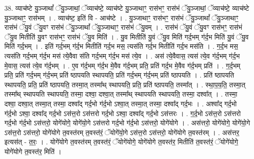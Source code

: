 \documentclass[17pt]{extarticle}
\begin{document}
38. व्याच॑ष्टे यु॒ञ्जाथां᳚ ॅयु॒ञ्जाथां॒ ॅव्याच॑ष्टे॒ व्याच॑ष्टे यु॒ञ्जाथाꣳ॒॒ रास॑भꣳ॒॒ रास॑भं ॅयु॒ञ्जाथां॒ ॅव्याच॑ष्टे॒ व्याच॑ष्टे यु॒ञ्जाथाꣳ॒॒ रास॑भम् । . व्याच॑ष्ट॒ इति॑ वि - आच॑ष्टे । . यु॒ञ्जाथाꣳ॒॒ रास॑भꣳ॒॒ रास॑भं ॅयु॒ञ्जाथां᳚ ॅयु॒ञ्जाथाꣳ॒॒ रास॑भं ॅयु॒वं ॅयु॒वꣳ रास॑भं ॅयु॒ञ्जाथां᳚ ॅयु॒ञ्जाथाꣳ॒॒ रास॑भं ॅयु॒वम् । . रास॑भं ॅयु॒वं ॅयु॒वꣳ रास॑भꣳ॒॒ रास॑भं ॅयु॒व मितीति॑ यु॒वꣳ रास॑भꣳ॒॒ रास॑भं ॅयु॒व मिति॑ । . यु॒व मितीति॑ यु॒वं ॅयु॒व मिति॑ गर्द॒भम् ग॑र्द॒भ मिति॑ यु॒वं ॅयु॒व मिति॑ गर्द॒भम् । . इति॑ गर्द॒भम् ग॑र्द॒भ मितीति॑ गर्द॒भ मस॒ त्यस॑ति गर्द॒भ मितीति॑ गर्द॒भ मस॑ति । . ग॒र्द॒भ मस॒ त्यस॑ति गर्द॒भम् ग॑र्द॒भ मस॑ त्ये॒वैवा स॑ति गर्द॒भम् ग॑र्द॒भ मस॑ त्ये॒व । . अस॑ त्ये॒वैवास॒ त्यस॑ त्ये॒व ग॑र्द॒भम् ग॑र्द॒भ मे॒वास॒ त्यस॑ त्ये॒व ग॑र्द॒भम् । . ए॒व ग॑र्द॒भम् ग॑र्द॒भ मे॒वैव ग॑र्द॒भम् प्रति॒ प्रति॑ गर्द॒भ मे॒वैव ग॑र्द॒भम् प्रति॑ । . ग॒र्द॒भम् प्रति॒ प्रति॑ गर्द॒भम् ग॑र्द॒भम् प्रति॑ ष्ठापयति स्थापयति॒ प्रति॑ गर्द॒भम् ग॑र्द॒भम् प्रति॑ ष्ठापयति । . प्रति॑ ष्ठापयति स्थापयति॒ प्रति॒ प्रति॑ ष्ठापयति॒ तस्मा॒त् तस्मा᳚थ् स्थापयति॒ प्रति॒ प्रति॑ ष्ठापयति॒ तस्मा᳚त् । . स्था॒प॒य॒ति॒ तस्मा॒त् तस्मा᳚थ् स्थापयति स्थापयति॒ तस्मा॒ दश्वा॒ दश्वा॒त् तस्मा᳚थ् स्थापयति स्थापयति॒ तस्मा॒ दश्वा᳚त् । . तस्मा॒ दश्वा॒ दश्वा॒त् तस्मा॒त् तस्मा॒ दश्वा᳚द् गर्द॒भो ग॑र्द॒भो ऽश्वा॒त् तस्मा॒त् तस्मा॒ दश्वा᳚द् गर्द॒भः । . अश्वा᳚द् गर्द॒भो ग॑र्द॒भो ऽश्वा॒ दश्वा᳚द् गर्द॒भो ऽस॑त्त॒रो ऽस॑त्तरो गर्द॒भो ऽश्वा॒ दश्वा᳚द् गर्द॒भो ऽस॑त्तरः । . ग॒र्द॒भो ऽस॑त्त॒रो ऽस॑त्तरो गर्द॒भो ग॑र्द॒भो ऽस॑त्तरो॒ योगे॑योगे॒ योगे॑यो॒गे ऽस॑त्तरो गर्द॒भो ग॑र्द॒भो ऽस॑त्तरो॒ योगे॑योगे । . अस॑त्तरो॒ योगे॑योगे॒ योगे॑यो॒गे ऽस॑त्त॒रो ऽस॑त्तरो॒ योगे॑योगे त॒वस्त॑रम् त॒वस्त॑रं॒ ॅयोगे॑यो॒गे ऽस॑त्त॒रो ऽस॑त्तरो॒ योगे॑योगे त॒वस्त॑रम् । . अस॑त्तर॒ इत्यस॑त् - त॒रः॒ । . योगे॑योगे त॒वस्त॑रम् त॒वस्त॑रं॒ ॅयोगे॑योगे॒ योगे॑योगे त॒वस्त॑र॒ मितीति॑ त॒वस्त॑रं॒ ॅयोगे॑योगे॒ योगे॑योगे त॒वस्त॑र॒ मिति॑ । \newline
\end{document}
